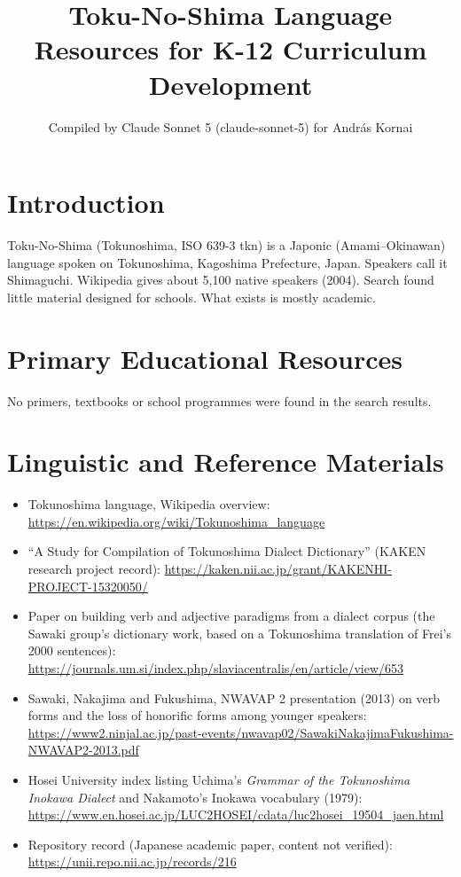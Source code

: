 \documentclass[12pt]{article}
\title{Toku-No-Shima Language Resources for K-12 Curriculum Development}
\author{Compiled by Claude Sonnet 5 (claude-sonnet-5) for Andr\'as Kornai}
\date{}
\begin{document}
\maketitle

\section{Introduction}
Toku-No-Shima (Tokunoshima, ISO 639-3 tkn) is a Japonic (Amami--Okinawan) language spoken on Tokunoshima, Kagoshima Prefecture, Japan. Speakers call it Shimaguchi. Wikipedia gives about 5,100 native speakers (2004). Search found little material designed for schools. What exists is mostly academic.

\section{Primary Educational Resources}
No primers, textbooks or school programmes were found in the search results.

\section{Linguistic and Reference Materials}
\begin{itemize}
\item Tokunoshima language, Wikipedia overview: \url{https://en.wikipedia.org/wiki/Tokunoshima_language}
\item ``A Study for Compilation of Tokunoshima Dialect Dictionary'' (KAKEN research project record): \url{https://kaken.nii.ac.jp/grant/KAKENHI-PROJECT-15320050/}
\item Paper on building verb and adjective paradigms from a dialect corpus (the Sawaki group's dictionary work, based on a Tokunoshima translation of Frei's 2000 sentences): \url{https://journals.um.si/index.php/slaviacentralis/en/article/view/653}
\item Sawaki, Nakajima and Fukushima, NWAVAP 2 presentation (2013) on verb forms and the loss of honorific forms among younger speakers: \url{https://www2.ninjal.ac.jp/past-events/nwavap02/SawakiNakajimaFukushima-NWAVAP2-2013.pdf}
\item Hosei University index listing Uchima's \emph{Grammar of the Tokunoshima Inokawa Dialect} and Nakamoto's Inokawa vocabulary (1979): \url{https://www.en.hosei.ac.jp/LUC2HOSEI/cdata/luc2hosei_19504_jaen.html}
\item Repository record (Japanese academic paper, content not verified): \url{https://unii.repo.nii.ac.jp/records/216}
\end{itemize}
\end{document}
